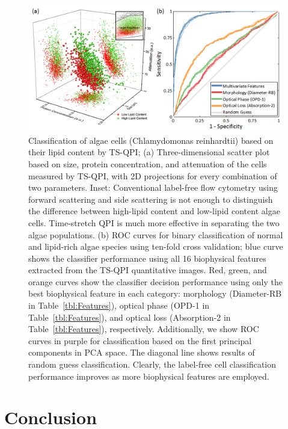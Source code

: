 \documentclass[aps,pra,reprint,superscriptaddress]{revtex4-1}
\begin{document}
\begin{figure}
\includegraphics[scale=0.6]{FigureAlgae.jpg}
\caption{\label{fig:AlgaeScatter} Classification of algae cells (Chlamydomonas reinhardtii) based on their lipid content by TS-QPI; (a) Three-dimensional scatter plot based on size, protein concentration, and attenuation of the cells measured by TS-QPI, with 2D projections for every combination of two parameters. Inset: Conventional label-free flow cytometry using forward scattering and side scattering is not enough to distinguish the difference between high-lipid content and low-lipid content algae cells. Time-stretch QPI is much more effective in separating the two algae populations. (b) ROC curves for binary classification of normal and lipid-rich algae species using ten-fold cross validation; blue curve shows the classifier performance using all 16 biophysical features extracted from the TS-QPI quantitative images. Red, green, and orange curves show the classifier decision performance using only the best biophysical feature in each category: morphology (Diameter-RB in Table~\ref{tbl:Features}), optical phase (OPD-1 in Table~\ref{tbl:Features}), and optical loss (Absorption-2 in Table~\ref{tbl:Features}), respectively. Additionally, we show ROC curves in purple for classification based on the first principal components in PCA space. The diagonal line shows results of random guess classification. Clearly, the label-free cell classification performance improves as more biophysical features are employed.}
\end{figure}

\section{Conclusion}
\end{document}
